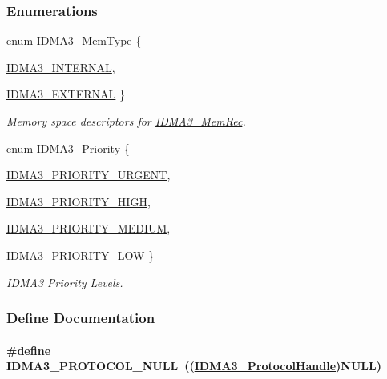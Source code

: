 \subsubsection*{Enumerations}
\begin{CompactItemize}
\item 
enum \hyperlink{group___d_s_p_i_d_m_a3_gbe0577eecc288b36121382daa765093a}{IDMA3\_\-Mem\-Type} \{ \par
\hyperlink{group___d_s_p_i_d_m_a3_ggbe0577eecc288b36121382daa765093a120151b2c6d2d5bcb2d59466b0d13287}{IDMA3\_\-INTERNAL}, 
\par
\hyperlink{group___d_s_p_i_d_m_a3_ggbe0577eecc288b36121382daa765093a9e757f072f4782774d8cd4b647563c54}{IDMA3\_\-EXTERNAL}
 \}
\begin{CompactList}\small\item\em Memory space descriptors for \hyperlink{struct_i_d_m_a3___mem_rec}{IDMA3\_\-Mem\-Rec}. \item\end{CompactList}\item 
enum \hyperlink{group___d_s_p_i_d_m_a3_gfa41dccd2cc8f94915fffdda2c8b4a59}{IDMA3\_\-Priority} \{ \par
\hyperlink{group___d_s_p_i_d_m_a3_ggfa41dccd2cc8f94915fffdda2c8b4a5990abf287e878aedcfbc17d19266f207c}{IDMA3\_\-PRIORITY\_\-URGENT}, 
\par
\hyperlink{group___d_s_p_i_d_m_a3_ggfa41dccd2cc8f94915fffdda2c8b4a592bd88e579d019a160876842f0c92f325}{IDMA3\_\-PRIORITY\_\-HIGH}, 
\par
\hyperlink{group___d_s_p_i_d_m_a3_ggfa41dccd2cc8f94915fffdda2c8b4a594f3bbe300c3ce513644f31991b6788ca}{IDMA3\_\-PRIORITY\_\-MEDIUM}, 
\par
\hyperlink{group___d_s_p_i_d_m_a3_ggfa41dccd2cc8f94915fffdda2c8b4a598560a79ce3c83622bed84ecb31b57aff}{IDMA3\_\-PRIORITY\_\-LOW}
 \}
\begin{CompactList}\small\item\em IDMA3 Priority Levels. \item\end{CompactList}\end{CompactItemize}


\subsubsection{Define Documentation}
\hypertarget{group___d_s_p_i_d_m_a3_g85de540d61ac83857803528f25f44e4b}{
\paragraph[IDMA3\_\-PROTOCOL\_\-NULL]{\setlength{\rightskip}{0pt plus 5cm}\#define IDMA3\_\-PROTOCOL\_\-NULL~((\hyperlink{struct_i_d_m_a3___protocol_obj}{IDMA3\_\-Protocol\-Handle})NULL)}\hfill}
\label{group___d_s_p_i_d_m_a3_g85de540d61ac83857803528f25f44e4b}


